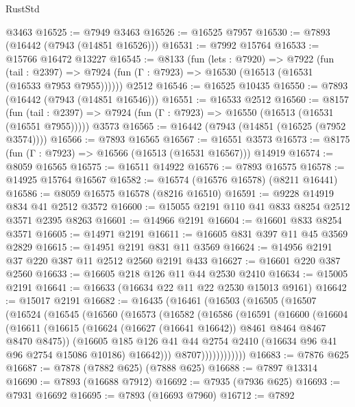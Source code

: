 \begin{lexlean}{RustStd}
\begin{coremodule}
    @3463
@16525 := @7949 @3463
@16526 := @16525 @7957
@16530 := @7893 (@16442 (@7943 (@14851 @16526)))
@16531 := @7992 @15764
@16533 := @15766 @16472 @13227
@16545 := @8133
    (fun (lets : @7920) =>
    @7922
      (fun (tail : @2397) =>
      @7924 (fun (Γ : @7923) => @16530 (@16513 (@16531 (@16533 @7953 @7955))))))
    @2512
@16546 := @16525 @10435
@16550 := @7893 (@16442 (@7943 (@14851 @16546)))
@16551 := @16533 @2512
@16560 := @8157
    (fun (tail : @2397) => @7924 (fun (Γ : @7923) => @16550 (@16513 (@16531 (@16551 @7955)))))
    @3573
@16565 := @16442 (@7943 (@14851 (@16525 (@7952 @3574))))
@16566 := @7893 @16565
@16567 := @16551 @3573
@16573 := @8175 (fun (Γ : @7923) => @16566 (@16513 (@16531 @16567))) @14919
@16574 := @8059 @16565
@16575 := @16511 @14922
@16576 := @7893 @16575
@16578 := @14925 @15764 @16567
@16582 := @16574 (@16576 @16578) (@8211 @16441)
@16586 := @8059 @16575 @16578 (@8216 @16510)
@16591 := @9228 @14919 @834 @41 @2512 @3572
@16600 := @15055 @2191 @110 @41 @833 @8254 @2512 @3571 @2395 @8263
@16601 := @14966 @2191
@16604 := @16601 @833 @8254 @3571
@16605 := @14971 @2191
@16611 := @16605 @831 @397 @11 @45 @3569 @2829
@16615 := @14951 @2191 @831 @11 @3569
@16624 := @14956 @2191 @37 @220 @387 @11 @2512 @2560 @2191 @433
@16627 := @16601 @220 @387 @2560
@16633 := @16605 @218 @126 @11 @44 @2530 @2410
@16634 := @15005 @2191
@16641 := @16633 (@16634 @22 @11 @22 @2530 @15013 @9161)
@16642 := @15017 @2191
@16682 := @16435
    (@16461
      (@16503
        (@16505
          (@16507
            (@16524
              (@16545
                (@16560
                  (@16573
                    (@16582
                      (@16586
                        (@16591
                          (@16600
                            (@16604
                              (@16611
                                (@16615
                                  (@16624 (@16627 (@16641 @16642)) @8461 @8464 @8467 @8470 @8475))
                                (@16605
                                  @185
                                  @126
                                  @41
                                  @44
                                  @2754
                                  @2410
                                  (@16634 @96 @41 @96 @2754 @15086 @10186)
                                  @16642)))
                            @8707))))))))))))
@16683 := @7876 @625
@16687 := @7878 (@7882 @625) (@7888 @625)
@16688 := @7897 @13314
@16690 := @7893 (@16688 @7912)
@16692 := @7935 (@7936 @625)
@16693 := @7931 @16692
@16695 := @7893 (@16693 @7960)
@16712 := @7892

\end{coremodule}
\end{lexlean}
